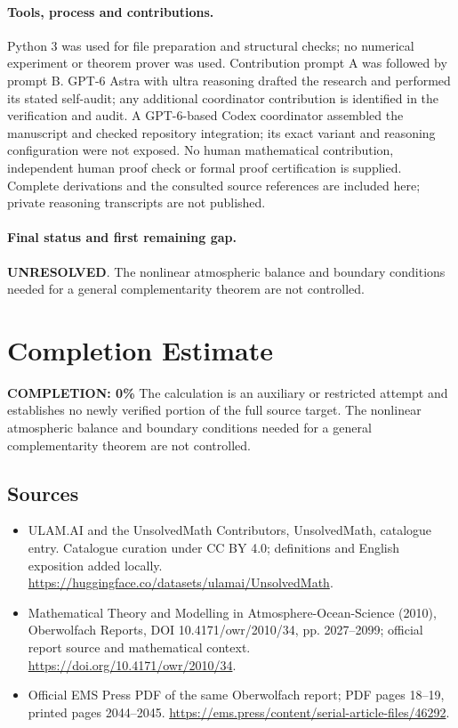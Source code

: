 \documentclass[11pt]{article}
\begin{document}
\paragraph{Tools, process and contributions.}
Python 3 was used for file preparation and structural checks; no numerical experiment or theorem prover was used. Contribution prompt A was followed by prompt B. GPT-6 Astra with ultra reasoning drafted the research and performed its stated self-audit; any additional coordinator contribution is identified in the verification and audit. A GPT-6-based Codex coordinator assembled the manuscript and checked repository integration; its exact variant and reasoning configuration were not exposed. No human mathematical contribution, independent human proof check or formal proof certification is supplied. Complete derivations and the consulted source references are included here; private reasoning transcripts are not published.

\paragraph{Final status and first remaining gap.}
\textbf{UNRESOLVED}. The nonlinear atmospheric balance and boundary conditions needed for a general complementarity theorem are not controlled.

\section{Completion Estimate}
\noindent\textbf{COMPLETION: 0\%}
The calculation is an auxiliary or restricted attempt and establishes no newly verified portion of the full source target. The nonlinear atmospheric balance and boundary conditions needed for a general complementarity theorem are not controlled.

\subsection{Sources}
\begin{itemize}
\item[\hypertarget{source:statement:1}{S1}] ULAM.AI and the UnsolvedMath Contributors, UnsolvedMath, catalogue entry. Catalogue curation under CC BY 4.0; definitions and English exposition added locally.
\url{https://huggingface.co/datasets/ulamai/UnsolvedMath}.
\item[\hypertarget{source:statement:2}{S2}] Mathematical Theory and Modelling in Atmosphere-Ocean-Science (2010), Oberwolfach Reports, DOI 10.4171/owr/2010/34, pp. 2027--2099; official report source and mathematical context.
\url{https://doi.org/10.4171/owr/2010/34}.
\item[\hypertarget{source:statement:3}{S3}] Official EMS Press PDF of the same Oberwolfach report; PDF pages 18--19, printed pages 2044--2045.
\url{https://ems.press/content/serial-article-files/46292}.
\end{itemize}
\label{end:statement}
\end{document}
